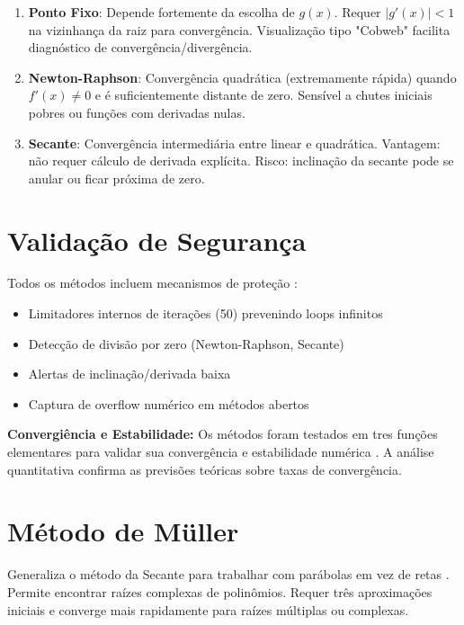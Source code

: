 \documentclass[
	12pt,				%
	openright,			%
	oneside,			%
	a4paper,			%
	english,			%
	brazil				%
	]{abntex2}
\begin{document}
\begin{enumerate}
    \item \textbf{Ponto Fixo}: Depende fortemente da escolha de $g(x)$. Requer $|g'(x)| < 1$ na vizinhança da raiz para convergência. Visualização tipo "Cobweb" facilita diagnóstico de convergência/divergência.
    
    \item \textbf{Newton-Raphson}: Convergência quadrática (extremamente rápida) quando $f'(x) \neq 0$ e é suficientemente distante de zero. Sensível a chutes iniciais pobres ou funções com derivadas nulas.
    
    \item \textbf{Secante}: Convergência intermediária entre linear e quadrática. Vantagem: não requer cálculo de derivada explícita. Risco: inclinação da secante pode se anular ou ficar próxima de zero.
\end{enumerate}

\section{Validação de Segurança}

Todos os métodos incluem mecanismos de proteção \cite{press1992}:

\begin{itemize}
    \item Limitadores internos de iterações (50) prevenindo loops infinitos
    \item Detecção de divisão por zero (Newton-Raphson, Secante)
    \item Alertas de inclinação/derivada baixa
    \item Captura de overflow numérico em métodos abertos
\end{itemize}

\textbf{Convergiência e Estabilidade:} Os métodos foram testados em tres funções elementares para validar sua convergência e estabilidade numérica \cite{fortuna2000}. A análise quantitativa confirma as previsões teóricas sobre taxas de convergência.

\section{Método de Müller}

Generaliza o método da Secante para trabalhar com parábolas em vez de retas \cite{muller1956}. Permite encontrar raízes complexas de polinômios. Requer três aproximações iniciais e converge mais rapidamente para raízes múltiplas ou complexas.
\end{document}
